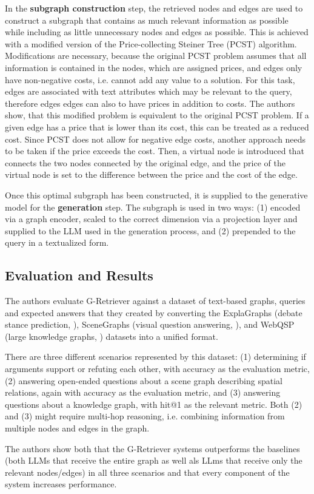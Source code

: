 In the \textbf{subgraph construction} step, the retrieved nodes and edges are used to construct a subgraph that contains as much relevant information as possible while including as little unnecessary nodes and edges as possible.
This is achieved with a modified version of the Price-collecting Steiner Tree (PCST) algorithm.
Modifications are necessary, because the original PCST problem assumes that all information is contained in the nodes, which are assigned prices, and edges only have non-negative costs, i.e. cannot add any value to a solution.
For this task, edges are associated with text attributes which may be relevant to the query, therefore edges edges can also to have prices in addition to costs.
The authors show, that this modified problem is equivalent to the original PCST problem.
If a given edge has a price that is lower than its cost, this can be treated as a reduced cost.
Since PCST does not allow for negative edge costs, another approach needs to be taken if the price exceeds the cost.
Then, a virtual node is introduced that connects the two nodes connected by the original edge, and the price of the virtual node is set to the difference between the price and the cost of the edge.

Once this optimal subgraph has been constructed, it is supplied to the generative model for the \textbf{generation} step.
The subgraph is used in two ways: (1) encoded via a graph encoder, scaled to the correct dimension via a projection layer and supplied to the LLM used in the generation process, and (2) prepended to the query in a textualized form.

\subsection{Evaluation and Results}

The authors evaluate G-Retriever against a dataset of text-based graphs, queries and expected answers that they created by converting the ExplaGraphs (debate stance prediction, \cite{explagraphs}), SceneGraphs (visual question answering, \cite{scenegraphs}), and WebQSP (large knowledge graphs, \cite{webqsp}) datasets into a unified format.

There are three different scenarios represented by this dataset: (1) determining if arguments support or refuting each other, with accuracy as the evaluation metric, (2) answering open-ended questions about a scene graph describing spatial relations, again with accuracy as the evaluation metric, and (3) answering questions about a knowledge graph, with hit@1 as the relevant metric. Both (2) and (3) might require multi-hop reasoning, i.e. combining information from multiple nodes and edges in the graph.

The authors show both that the G-Retriever systems outperforms the baselines (both LLMs that receive the entire graph as well als LLms that receive only the relevant nodes/edges) in all three scenarios and that every component of the system increases performance.
